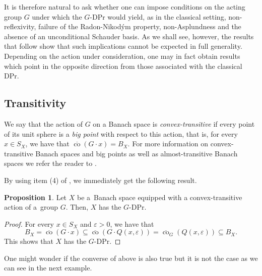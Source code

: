 \documentclass[a4paper,12pt]{amsart}
\theoremstyle{definition}
\newtheorem{proposition}[theorem]{Proposition}
\theoremstyle{definition}
\theoremstyle{remark}
\numberwithin{equation}{section}
\DeclareMathOperator{\co}{co}
\newcommand{\<}{\langle}
\renewcommand{\>}{\rangle}
\newcommand{\e}{\varepsilon}
\newcommand{\eps}{\e}
\begin{document}
	It is therefore natural to ask whether one can impose conditions on the acting group $G$ under which the $G$-DPr would yield, as in the classical setting, non-reflexivity, failure of the Radon-Nikodým property, non-Asplundness and the absence of an unconditional Schauder basis. As we shall see, however, the results that follow show that such implications cannot be expected in full generality. Depending on the action under consideration, one may in fact obtain results which point in the opposite direction from those associated with the classical DPr.
	
	\subsection{Transitivity} \label{section:transitivity} We say that the action of $G$ on a Banach space is {\it convex-transitive} if every point of its unit sphere is a {\it big point} with respect to this action, that is, for every $x \in S_X$, we have that $\overline{\co}(G \cdot x) = B_X$. For more information on convex-transitive Banach spaces and big points as well as almost-transitive Banach spaces we refer the reader to \cite{BG-RP99,BG-RP02}.
	
	
	
	By using item (4) of , we immediately get the following result.
	\begin{proposition} \label{cor:convexTranstiveImpliesGDP}
		Let $X$ be a~Banach space equipped with a convex-transitive action of a~group $G$. Then, $X$ has the $G$-DPr.
	\end{proposition}
	\begin{proof}
		For every $x \in S_X$ and $\eps > 0$, we have that
		\begin{equation*}
			B_X = \overline{\co}(G \cdot x)
			\subseteq \overline{\co}(G \cdot Q(x, \eps))
			= \overline{\co}_{G}(Q(x, \eps))
			\subseteq B_X.
		\end{equation*}
		This shows that $X$ has the $G$-DPr.
	\end{proof}
	
	One might wonder if the converse of  above is also true but it is not the case as we can see in the next example.
	
\end{document}
